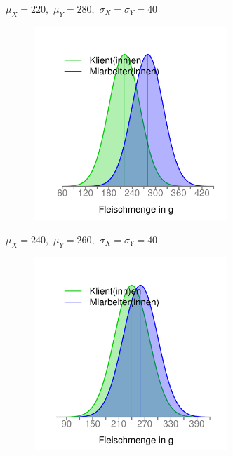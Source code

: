 \documentclass[usenames,dvipsnames,handout]{beamer}
\begin{document}
\begin{frame}{$\mu_{X}=220,$ $\mu_{Y}=280,$ $\sigma_{X}=\sigma_{Y}=40$}
  \begin{figure}[ht]
 	\centering
 	      \includegraphics[width=0.65\textwidth]{mx220my280sd40.pdf}
 	\end{figure}
\end{frame}

\begin{frame}{$\mu_{X}=240,$ $\mu_{Y}=260,$ $\sigma_{X}=\sigma_{Y}=40$}
  \begin{figure}[ht]
 	\centering
 	      \includegraphics[width=0.65\textwidth]{nearlyfair.pdf}
 	\end{figure}
\end{frame}
\end{document}
